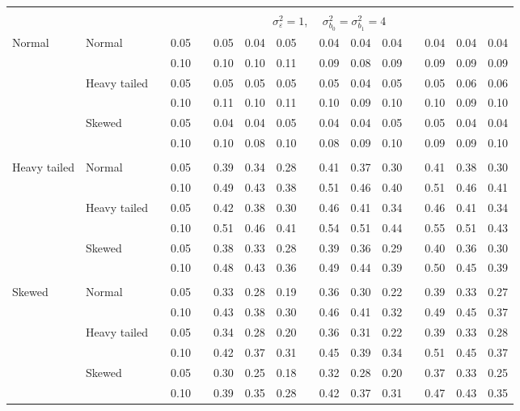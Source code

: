 \documentclass[12pt]{article} %
\begin{document}
\begin{table}[ht]
\begin{scriptsize}
\begin{center}
\begin{tabular}{ll p{.1cm} c p{.1cm} rrr p{.1cm} rrr p{.1cm} rrr}
&&&&&&&&&&&&&&&\\
& && && \multicolumn{9}{c}{$\sigma_{\varepsilon}^2 = 1$, \ \ $\sigma_{b_0}^2 = \sigma_{b_1}^2 = 4$} \\ \cline{6-16}
\rowcolor{gray!20}Normal       & Normal       && 0.05 &&   0.05 & 0.04 & 0.05 && 0.04 & 0.04 & 0.04 &&   0.04 & 0.04 & 0.04 \\
\rowcolor{gray!20}             &              && 0.10 &&   0.10 & 0.10 & 0.11 && 0.09 & 0.08 & 0.09 &&   0.09 & 0.09 & 0.09 \\
\rowcolor{gray!20}             & Heavy tailed && 0.05 &&   0.05 & 0.05 & 0.05 && 0.05 & 0.04 & 0.05 &&   0.05 & 0.06 & 0.06 \\
\rowcolor{gray!20}             &              && 0.10 &&   0.11 & 0.10 & 0.11 && 0.10 & 0.09 & 0.10 &&   0.10 & 0.09 & 0.10 \\
\rowcolor{gray!20}             & Skewed       && 0.05 &&   0.04 & 0.04 & 0.05 && 0.04 & 0.04 & 0.05 &&   0.05 & 0.04 & 0.04 \\
\rowcolor{gray!20}             &              && 0.10 &&   0.10 & 0.08 & 0.10 && 0.08 & 0.09 & 0.10 &&   0.09 & 0.09 & 0.10 \\
             &&&&&&&&&&&&&&&\\
Heavy tailed & Normal       && 0.05 &&   0.39 & 0.34 & 0.28 && 0.41 & 0.37 & 0.30 &&  0.41 & 0.38 & 0.30 \\
             &              && 0.10 &&   0.49 & 0.43 & 0.38 && 0.51 & 0.46 & 0.40 &&  0.51 & 0.46 & 0.41 \\
             & Heavy tailed && 0.05 &&   0.42 & 0.38 & 0.30 && 0.46 & 0.41 & 0.34 &&  0.46 & 0.41 & 0.34 \\
             &              && 0.10 &&   0.51 & 0.46 & 0.41 && 0.54 & 0.51 & 0.44 &&  0.55 & 0.51 & 0.43 \\
             & Skewed       && 0.05 &&   0.38 & 0.33 & 0.28 && 0.39 & 0.36 & 0.29 &&  0.40 & 0.36 & 0.30 \\
             &              && 0.10 &&   0.48 & 0.43 & 0.36 && 0.49 & 0.44 & 0.39 &&  0.50 & 0.45 & 0.39 \\
             &&&&&&&&&&&&&&&\\
Skewed       & Normal       && 0.05 &&   0.33 & 0.28 & 0.19 && 0.36 & 0.30 & 0.22 &&  0.39 & 0.33 & 0.27 \\
             &              && 0.10 &&   0.43 & 0.38 & 0.30 && 0.46 & 0.41 & 0.32 &&  0.49 & 0.45 & 0.37 \\
             & Heavy tailed && 0.05 &&   0.34 & 0.28 & 0.20 && 0.36 & 0.31 & 0.22 &&  0.39 & 0.33 & 0.28 \\
             &              && 0.10 &&   0.42 & 0.37 & 0.31 && 0.45 & 0.39 & 0.34 &&  0.51 & 0.45 & 0.37 \\
             & Skewed       && 0.05 &&   0.30 & 0.25 & 0.18 && 0.32 & 0.28 & 0.20 &&  0.37 & 0.33 & 0.25 \\
             &              && 0.10 &&   0.39 & 0.35 & 0.28 && 0.42 & 0.37 & 0.31 &&  0.47 & 0.43 & 0.35 \\



\end{tabular}
\end{center}
\end{scriptsize}
\end{table}
\end{document}
